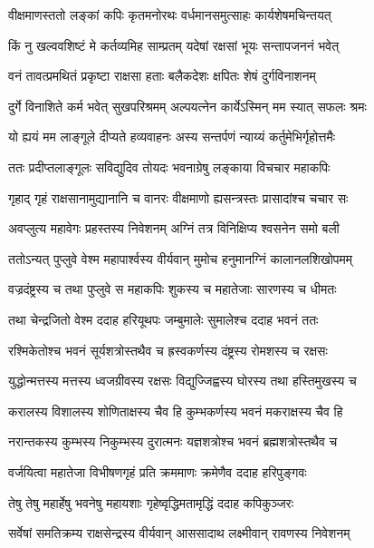 
\twolineshloka
{वीक्षमाणस्ततो लङ्कां कपिः कृतमनोरथः}
{वर्धमानसमुत्साहः कार्यशेषमचिन्तयत्} %

\twolineshloka
{किं नु खल्ववशिष्टं मे कर्तव्यमिह साम्प्रतम्}
{यदेषां रक्षसां भूयः सन्तापजननं भवेत्} %

\twolineshloka
{वनं तावत्प्रमथितं प्रकृष्टा राक्षसा हताः}
{बलैकदेशः क्षपितः शेषं दुर्गविनाशनम्} %

\twolineshloka
{दुर्गे विनाशिते कर्म भवेत् सुखपरिश्रमम्}
{अल्पयत्नेन कार्येऽस्मिन् मम स्यात् सफलः श्रमः} %

\twolineshloka
{यो ह्ययं मम लाङ्गूले दीप्यते हव्यवाहनः}
{अस्य सन्तर्पणं न्याय्यं कर्तुमेभिर्गृहोत्तमैः} %

\twolineshloka
{ततः प्रदीप्तलाङ्गूलः सविद्युदिव तोयदः}
{भवनाग्रेषु लङ्काया विचचार महाकपिः} %

\twolineshloka
{गृहाद् गृहं राक्षसानामुद्यानानि च वानरः}
{वीक्षमाणो ह्यसन्त्रस्तः प्रासादांश्च चचार सः} %

\twolineshloka
{अवप्लुत्य महावेगः प्रहस्तस्य निवेशनम्}
{अग्निं तत्र विनिक्षिप्य श्वसनेन समो बली} %

\twolineshloka
{ततोऽन्यत् पुप्लुवे वेश्म महापार्श्वस्य वीर्यवान्}
{मुमोच हनुमानग्निं कालानलशिखोपमम्} %

\twolineshloka
{वज्रदंष्ट्रस्य च तथा पुप्लुवे स महाकपिः}
{शुकस्य च महातेजाः सारणस्य च धीमतः} %

\twolineshloka
{तथा चेन्द्रजितो वेश्म ददाह हरियूथपः}
{जम्बुमालेः सुमालेश्च ददाह भवनं ततः} %

\twolineshloka
{रश्मिकेतोश्च भवनं सूर्यशत्रोस्तथैव च}
{ह्रस्वकर्णस्य दंष्ट्रस्य रोमशस्य च रक्षसः} %

\twolineshloka
{युद्धोन्मत्तस्य मत्तस्य ध्वजग्रीवस्य रक्षसः}
{विद्युज्जिह्वस्य घोरस्य तथा हस्तिमुखस्य च} %

\twolineshloka
{करालस्य विशालस्य शोणिताक्षस्य चैव हि}
{कुम्भकर्णस्य भवनं मकराक्षस्य चैव हि} %

\twolineshloka
{नरान्तकस्य कुम्भस्य निकुम्भस्य दुरात्मनः}
{यज्ञशत्रोश्च भवनं ब्रह्मशत्रोस्तथैव च} %

\twolineshloka
{वर्जयित्वा महातेजा विभीषणगृहं प्रति}
{क्रममाणः क्रमेणैव ददाह हरिपुङ्गवः} %

\twolineshloka
{तेषु तेषु महार्हेषु भवनेषु महायशाः}
{गृहेष्वृद्धिमतामृद्धिं ददाह कपिकुञ्जरः} %

\twolineshloka
{सर्वेषां समतिक्रम्य राक्षसेन्द्रस्य वीर्यवान्}
{आससादाथ लक्ष्मीवान् रावणस्य निवेशनम्} %


